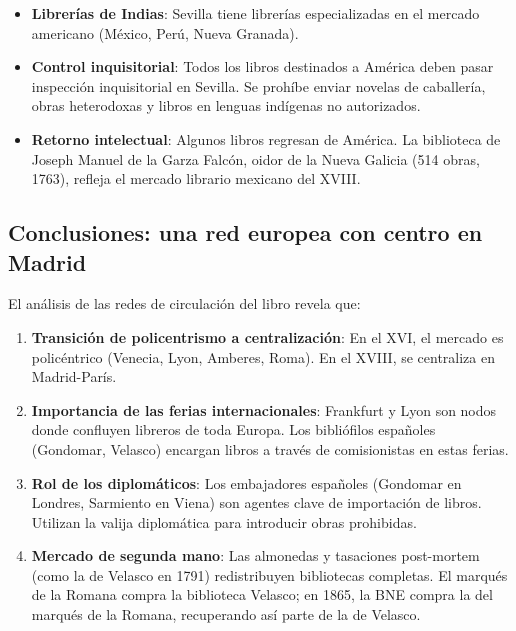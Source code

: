 \documentclass[11pt,a4paper]{article}
\begin{document}
\begin{itemize}
\item \textbf{Librerías de Indias}: Sevilla tiene librerías especializadas en el mercado americano (México, Perú, Nueva Granada).

\item \textbf{Control inquisitorial}: Todos los libros destinados a América deben pasar inspección inquisitorial en Sevilla. Se prohíbe enviar novelas de caballería, obras heterodoxas y libros en lenguas indígenas no autorizados.

\item \textbf{Retorno intelectual}: Algunos libros regresan de América. La biblioteca de Joseph Manuel de la Garza Falcón, oidor de la Nueva Galicia (514 obras, 1763), refleja el mercado librario mexicano del XVIII.
\end{itemize}

\subsection{Conclusiones: una red europea con centro en Madrid}

El análisis de las redes de circulación del libro revela que:

\begin{enumerate}
\item \textbf{Transición de policentrismo a centralización}: En el XVI, el mercado es policéntrico (Venecia, Lyon, Amberes, Roma). En el XVIII, se centraliza en Madrid-París.

\item \textbf{Importancia de las ferias internacionales}: Frankfurt y Lyon son nodos donde confluyen libreros de toda Europa. Los bibliófilos españoles (Gondomar, Velasco) encargan libros a través de comisionistas en estas ferias.

\item \textbf{Rol de los diplomáticos}: Los embajadores españoles (Gondomar en Londres, Sarmiento en Viena) son agentes clave de importación de libros. Utilizan la valija diplomática para introducir obras prohibidas.

\item \textbf{Mercado de segunda mano}: Las almonedas y tasaciones post-mortem (como la de Velasco en 1791) redistribuyen bibliotecas completas. El marqués de la Romana compra la biblioteca Velasco; en 1865, la BNE compra la del marqués de la Romana, recuperando así parte de la de Velasco.
\end{enumerate}
\end{document}

